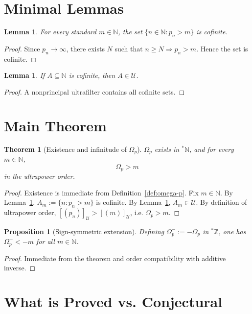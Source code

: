 \documentclass[11pt]{article}
\theoremstyle{definition}
\theoremstyle{plain}
\newtheorem{lemma}[definition]{Lemma}
\newtheorem{theorem}[definition]{Theorem}
\newtheorem{proposition}[definition]{Proposition}
\begin{document}
\section{Minimal Lemmas}
\begin{lemma}
\label{lem:cofinite-prime-tail}
For every standard \(m\in\mathbb N\), the set \(\{n\in\mathbb N: p_n>m\}\) is cofinite.
\end{lemma}
\begin{proof}
Since \(p_n\to\infty\), there exists \(N\) such that \(n\ge N\Rightarrow p_n>m\).
Hence the set is cofinite.
\end{proof}

\begin{lemma}
\label{lem:ultrafilter-cofinite}
If \(A\subseteq\mathbb N\) is cofinite, then \(A\in\mathcal U\).
\end{lemma}
\begin{proof}
A nonprincipal ultrafilter contains all cofinite sets.
\end{proof}

\section{Main Theorem}
\begin{theorem}[Existence and infinitude of \(\Omega_p\)]
\(\Omega_p\) exists in \({}^\ast\mathbb N\), and for every \(m\in\mathbb N\),
\[
\Omega_p > m
\]
in the ultrapower order.
\end{theorem}
\begin{proof}
Existence is immediate from Definition~\ref{def:omega-p}.
Fix \(m\in\mathbb N\). By Lemma~\ref{lem:cofinite-prime-tail}, \(A_m:=\{n:p_n>m\}\) is cofinite.
By Lemma~\ref{lem:ultrafilter-cofinite}, \(A_m\in\mathcal U\).
By definition of ultrapower order, \([(p_n)]_{\mathcal U}>[(m)]_{\mathcal U}\), i.e. \(\Omega_p>m\).
\end{proof}

\begin{proposition}[Sign-symmetric extension]
Defining \(\Omega_p^-:=-\Omega_p\) in \({}^\ast\mathbb Z\), one has \(\Omega_p^-< -m\) for all \(m\in\mathbb N\).
\end{proposition}
\begin{proof}
Immediate from the theorem and order compatibility with additive inverse.
\end{proof}

\section{What is Proved vs. Conjectural}
\end{document}
